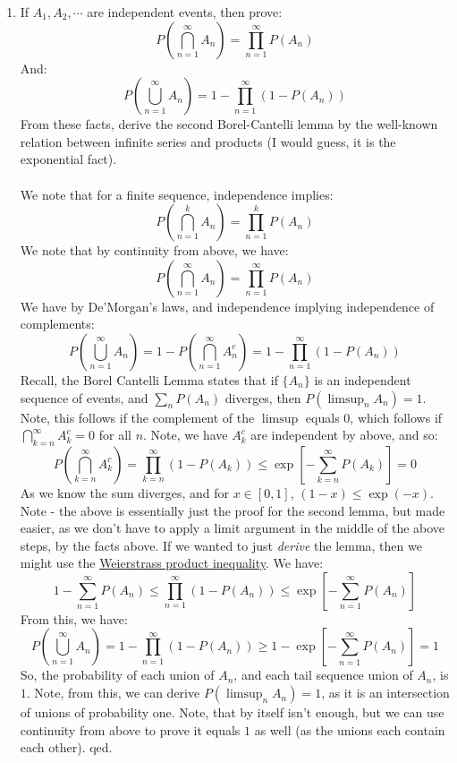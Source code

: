 \documentclass[12pt,a4paper]{article}
\newcommand{\1}[1]{\mathbbm{1}\left\{ #1 \right\}}
\begin{document}
\begin{enumerate}
	\item If $A_1, A_2, \cdots$ are independent events, then prove:
	$$
		P\left(\bigcap_{n=1}^\infty A_n\right) = \prod_{n=1}^\infty P(A_n)
	$$
	And:
	$$
		P\left(\bigcup_{n=1}^\infty A_n\right) = 1 - \prod_{n=1}^\infty (1 - P(A_n))
	$$
	From these facts, derive the second Borel-Cantelli lemma by the well-known relation between infinite series and products (I would guess, it is the exponential fact).
	\\\\
	We note that for a finite sequence, independence implies:
	$$
		P\left(\bigcap_{n=1}^k A_n\right) = \prod_{n=1}^k P(A_n)
	$$
	We note that by continuity from above, we have:
	$$
		P\left(\bigcap_{n=1}^\infty A_n\right) = \prod_{n=1}^\infty P(A_n)
	$$
	We have by De'Morgan's laws, and independence implying independence of complements:
	$$
		P\left(\bigcup_{n=1}^\infty A_n\right) = 1 - P\left(\bigcap_{n=1}^\infty A_n^c\right) =
		1 - \prod_{n=1}^\infty (1 - P(A_n))
	$$
	Recall, the Borel Cantelli Lemma states that if $\{A_n\}$ is an independent sequence of events, and $\sum_n P(A_n)$ diverges, then $P(\limsup_n A_n) = 1$. Note, this follows if the complement of the $\limsup$ equals $0$, which follows if $\bigcap_{k=n}^\infty A_k^c = 0$ for all $n$. Note, we have $A_k^c$ are independent by above, and so:
	$$
		P\left(\bigcap_{k=n}^\infty A_k^c\right) = \prod_{k=n}^\infty (1 - P(A_k)) \leq
		\exp\left[-\sum_{k=n}^\infty P(A_k)\right] = 0
	$$
	As we know the sum diverges, and for $x \in [0,1]$, $(1-x) \leq \exp(-x)$. Note - the above is essentially just the proof for the second lemma, but made easier, as we don't have to apply a limit argument in the middle of the above steps, by the facts above. If we wanted to just \textit{derive} the lemma, then we might use the \href{https://en.wikipedia.org/wiki/Weierstrass_product_inequality?utm_source=chatgpt.com}{Weierstrass product inequality}. We have:
	$$
		1 - \sum_{n=1}^\infty P(A_n) \leq \prod_{n=1}^\infty (1 - P(A_n)) \leq \exp\left[-\sum_{n=1}^\infty P(A_n)\right]
	$$
	From this, we have:
	$$
		P\left(\bigcup_{n=1}^\infty A_n\right) = 1 - \prod_{n=1}^\infty (1 - P(A_n)) \geq
		1 - \exp\left[-\sum_{n=1}^\infty P(A_n)\right] = 1
	$$
	So, the probability of each union of $A_n$, and each tail sequence union of $A_n$, is $1$. Note, from this, we can derive $P(\limsup_n A_n) = 1$, as it is an intersection of unions of probability one. Note, that by itself isn't enough, but we can use continuity from above to prove it equals $1$ as well (as the unions each contain each other). qed.
	

\end{enumerate}
\end{document}

